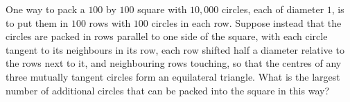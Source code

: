 One way to pack a $100$ by $100$ square with $10{,}000$ circles, each of diameter $1$, is to put them in $100$ rows with $100$ circles in each row. Suppose instead that the circles are packed in rows parallel to one side of the square, with each circle tangent to its neighbours in its row, each row shifted half a diameter relative to the rows next to it, and neighbouring rows touching, so that the centres of any three mutually tangent circles form an equilateral triangle. What is the largest number of additional circles that can be packed into the square in this way?
